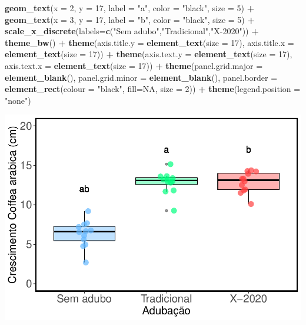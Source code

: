 \documentclass[
]{book}
\newenvironment{Shaded}{\begin{snugshade}}{\end{snugshade}}
\newcommand{\DataTypeTok}[1]{\textcolor[rgb]{0.13,0.29,0.53}{#1}}
\newcommand{\DecValTok}[1]{\textcolor[rgb]{0.00,0.00,0.81}{#1}}
\newcommand{\KeywordTok}[1]{\textcolor[rgb]{0.13,0.29,0.53}{\textbf{#1}}}
\newcommand{\NormalTok}[1]{#1}
\newcommand{\OperatorTok}[1]{\textcolor[rgb]{0.81,0.36,0.00}{\textbf{#1}}}
\newcommand{\OtherTok}[1]{\textcolor[rgb]{0.56,0.35,0.01}{#1}}
\newcommand{\StringTok}[1]{\textcolor[rgb]{0.31,0.60,0.02}{#1}}
\begin{document}
\begin{Shaded}
\begin{Highlighting}[]
\StringTok{  }\KeywordTok{geom_text}\NormalTok{(}\DataTypeTok{x =} \DecValTok{2}\NormalTok{, }\DataTypeTok{y =} \DecValTok{17}\NormalTok{, }\DataTypeTok{label =} \StringTok{"a"}\NormalTok{, }\DataTypeTok{color =} \StringTok{"black"}\NormalTok{, }\DataTypeTok{size =} \DecValTok{5}\NormalTok{) }\OperatorTok{+}
\StringTok{  }\KeywordTok{geom_text}\NormalTok{(}\DataTypeTok{x =} \DecValTok{3}\NormalTok{, }\DataTypeTok{y =} \DecValTok{17}\NormalTok{, }\DataTypeTok{label =} \StringTok{"b"}\NormalTok{, }\DataTypeTok{color =} \StringTok{"black"}\NormalTok{, }\DataTypeTok{size =} \DecValTok{5}\NormalTok{) }\OperatorTok{+}
\StringTok{  }\KeywordTok{scale_x_discrete}\NormalTok{(}\DataTypeTok{labels=}\KeywordTok{c}\NormalTok{(}\StringTok{"Sem adubo"}\NormalTok{,}\StringTok{"Tradicional"}\NormalTok{,}\StringTok{"X-2020"}\NormalTok{)) }\OperatorTok{+}
\StringTok{  }\KeywordTok{theme_bw}\NormalTok{() }\OperatorTok{+}
\StringTok{  }\KeywordTok{theme}\NormalTok{(}\DataTypeTok{axis.title.y =} \KeywordTok{element_text}\NormalTok{(}\DataTypeTok{size =} \DecValTok{17}\NormalTok{), }\DataTypeTok{axis.title.x =} \KeywordTok{element_text}\NormalTok{(}\DataTypeTok{size =} \DecValTok{17}\NormalTok{)) }\OperatorTok{+}
\StringTok{  }\KeywordTok{theme}\NormalTok{(}\DataTypeTok{axis.text.y =} \KeywordTok{element_text}\NormalTok{(}\DataTypeTok{size =} \DecValTok{17}\NormalTok{), }\DataTypeTok{axis.text.x =} \KeywordTok{element_text}\NormalTok{(}\DataTypeTok{size =} \DecValTok{17}\NormalTok{)) }\OperatorTok{+}
\StringTok{  }\KeywordTok{theme}\NormalTok{(}\DataTypeTok{panel.grid.major =} \KeywordTok{element_blank}\NormalTok{(), }\DataTypeTok{panel.grid.minor =} \KeywordTok{element_blank}\NormalTok{(), }
        \DataTypeTok{panel.border =} \KeywordTok{element_rect}\NormalTok{(}\DataTypeTok{colour =} \StringTok{"black"}\NormalTok{, }\DataTypeTok{fill=}\OtherTok{NA}\NormalTok{, }\DataTypeTok{size =} \DecValTok{2}\NormalTok{)) }\OperatorTok{+}
\StringTok{  }\KeywordTok{theme}\NormalTok{(}\DataTypeTok{legend.position =} \StringTok{"none"}\NormalTok{) }
\end{Highlighting}
\end{Shaded}

\includegraphics{livro_r_ecologia_files/figure-latex/unnamed-chunk-15-1.pdf}
\end{document}
